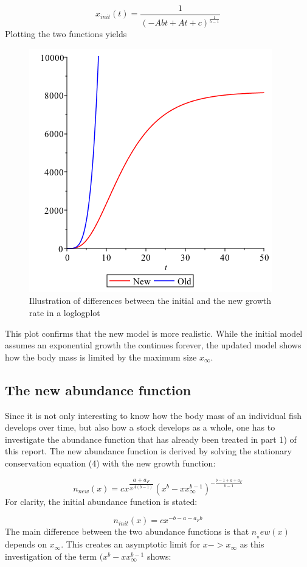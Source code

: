 \documentclass{article}
\numberwithin{equation}{section} %
\begin{document}
\begin{equation}
    x_{init}(t)=\dfrac{1}{(-Abt+At+c)^{\tfrac{1}{b-1}}}
\end{equation}
Plotting the two functions yields

\begin{figure}[h!]
\centering
\includegraphics[width=.6\textwidth]{exercises/ex6p2}
	\caption{Illustration of differences between the initial and the new growth rate in a loglogplot}
	\label{fig:ex6p2}
\end{figure}
This plot confirms that the new model is more realistic. While the initial model assumes an exponential growth the continues forever, the updated model shows how the body mass is limited by the maximum size $x_\infty$.
\subsection{The new abundance function}\label{sec:Ex6D}
Since it is not only interesting to know how the body mass of an individual fish develops over time, but also how a stock develops as a whole, one has
to investigate the abundance function that has already been treated in part 1) of this report. The new abundance function is derived by solving the stationary
conservation equation (4) with the new growth function: 

\begin{equation}
    n_{new}(x)=cx^{\dfrac{a+a_F}{x^{A(b-1)}}}(x^b-xx_\infty^{b-1})^{-\tfrac{b-1+a+a_F}{b-1}}
\end{equation}
For clarity, the initial abundance function is stated:

\begin{equation}
    n_{init}(x)=cx^{-b-a-a_Fb}
\end{equation}
The main difference between the two abundance functions is that $n__new(x)$ depends on $x_\infty$. This creates an asymptotic limit for $x -> x_\infty$ as this investigation of the term $(x^b-xx_\infty^{b-1}$ shows:
\end{document}
